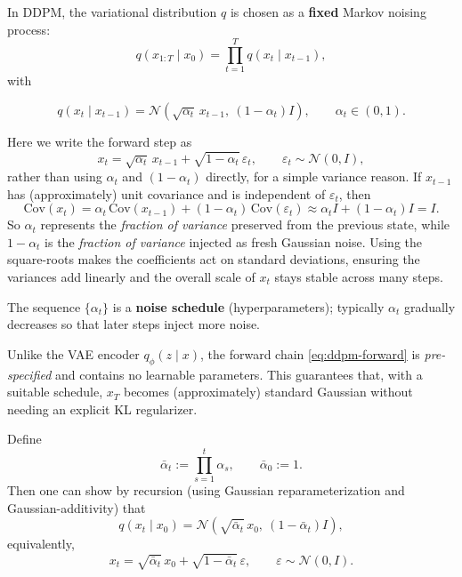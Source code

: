\documentclass[../main]{subfiles}
\begin{document}
In DDPM, the variational distribution $q$ is chosen as a \textbf{fixed} Markov noising process:
\begin{equation}
    q(x_{1:T}\mid x_0) = \prod_{t=1}^{T} q(x_t\mid x_{t-1}),
\end{equation}
with
\begin{theorem}
    \begin{equation}\label{eq:ddpm-forward}
        q(x_t\mid x_{t-1})
        = \mathcal N\!\left(\sqrt{\alpha_t}\,x_{t-1},\ (1-\alpha_t)I\right),
        \qquad \alpha_t\in(0,1).
    \end{equation}
\end{theorem}
\begin{remark}
    Here we write the forward step as
    \begin{equation}
        x_t=\sqrt{\alpha_t}\,x_{t-1}+\sqrt{1-\alpha_t}\,\varepsilon_t,
        \qquad \varepsilon_t\sim\mathcal N(0,I),
    \end{equation}
    rather than using $\alpha_t$ and $(1-\alpha_t)$ directly, for a simple variance reason. If $x_{t-1}$ has (approximately) unit covariance and is independent of $\varepsilon_t$, then
    \begin{equation}
        \mathrm{Cov}(x_t)
        =
        \alpha_t\,\mathrm{Cov}(x_{t-1})+(1-\alpha_t)\,\mathrm{Cov}(\varepsilon_t)
        \approx \alpha_t I + (1-\alpha_t)I = I.
    \end{equation}
    So $\alpha_t$ represents the \emph{fraction of variance} preserved from the previous state, while
    $1-\alpha_t$ is the \emph{fraction of variance} injected as fresh Gaussian noise.
    Using the square-roots makes the coefficients act on standard deviations, ensuring the variances add
    linearly and the overall scale of $x_t$ stays stable across many steps.
    \end{remark}
The sequence $\{\alpha_t\}$ is a \textbf{noise schedule} (hyperparameters); typically $\alpha_t$ gradually decreases
so that later steps inject more noise.

\begin{remark}
Unlike the VAE encoder $q_\phi(z\mid x)$, the forward chain \eqref{eq:ddpm-forward} is \emph{pre-specified} and contains no learnable parameters.
This guarantees that, with a suitable schedule, $x_T$ becomes (approximately) standard Gaussian without needing an explicit KL regularizer.
\end{remark}
Define
\begin{equation}
    \bar \alpha_t := \prod_{s=1}^{t} \alpha_s,\qquad \bar\alpha_0:=1.
\end{equation}
Then one can show by recursion (using Gaussian reparameterization and Gaussian-additivity) that
\begin{equation}\label{eq:ddpm-qxt-x0}
    q(x_t\mid x_0)
    = \mathcal N\!\left(\sqrt{\bar\alpha_t}\,x_0,\ (1-\bar\alpha_t)I\right),
\end{equation}
equivalently,
\begin{equation}\label{eq:ddpm-reparam}
    x_t
    = \sqrt{\bar\alpha_t}\,x_0
      + \sqrt{1-\bar\alpha_t}\,\varepsilon,
    \qquad \varepsilon\sim\mathcal N(0,I).
\end{equation}
\end{document}
